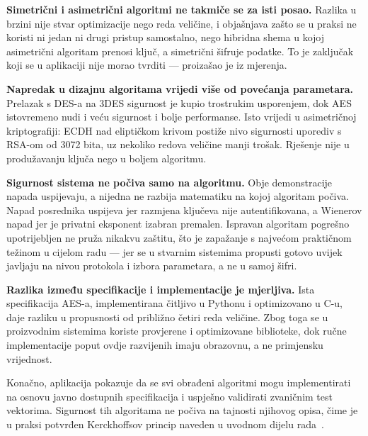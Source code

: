 \textbf{Simetrični i asimetrični algoritmi ne takmiče se za isti posao.} Razlika u brzini nije stvar optimizacije nego reda veličine, i objašnjava zašto se u praksi ne koristi ni jedan ni drugi pristup samostalno, nego hibridna shema u kojoj asimetrični algoritam prenosi ključ, a simetrični šifruje podatke. To je zaključak koji se u aplikaciji nije morao tvrditi --- proizašao je iz mjerenja.

\textbf{Napredak u dizajnu algoritama vrijedi više od povećanja parametara.} Prelazak s DES-a na 3DES sigurnost je kupio trostrukim usporenjem, dok AES istovremeno nudi i veću sigurnost i bolje performanse. Isto vrijedi u asimetričnoj kriptografiji: ECDH nad eliptičkom krivom postiže nivo sigurnosti uporediv s RSA-om od 3072 bita, uz nekoliko redova veličine manji trošak. Rješenje nije u produžavanju ključa nego u boljem algoritmu.

\textbf{Sigurnost sistema ne počiva samo na algoritmu.} Obje demonstracije napada uspijevaju, a nijedna ne razbija matematiku na kojoj algoritam počiva. Napad posrednika uspijeva jer razmjena ključeva nije autentifikovana, a Wienerov napad jer je privatni eksponent izabran premalen. Ispravan algoritam pogrešno upotrijebljen ne pruža nikakvu zaštitu, što je zapažanje s najvećom praktičnom težinom u cijelom radu --- jer se u stvarnim sistemima propusti gotovo uvijek javljaju na nivou protokola i izbora parametara, a ne u samoj šifri.

\textbf{Razlika između specifikacije i implementacije je mjerljiva.} Ista specifikacija AES-a, implementirana čitljivo u Pythonu i optimizovano u C-u, daje razliku u propusnosti od približno četiri reda veličine. Zbog toga se u proizvodnim sistemima koriste provjerene i optimizovane biblioteke, dok ručne implementacije poput ovdje razvijenih imaju obrazovnu, a ne primjensku vrijednost.

Konačno, aplikacija pokazuje da se svi obrađeni algoritmi mogu implementirati na osnovu javno dostupnih specifikacija i uspješno validirati zvaničnim test vektorima. Sigurnost tih algoritama ne počiva na tajnosti njihovog opisa, čime je u praksi potvrđen Kerckhoffsov princip naveden u uvodnom dijelu rada~\cite{kerckhoffs1883}.
